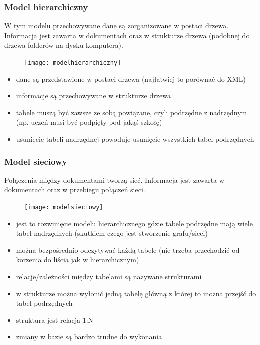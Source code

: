 \documentclass[a4paper,12pt,oneside]{book}
\begin{document}
			\subsubsection{Model hierarchiczny}
			W tym modelu przechowywane dane są zorganizowane w postaci drzewa. Informacja jest zawarta w dokumentach oraz w strukturze drzewa (podobnej do drzewa folderów na dysku komputera).
			\begin{figure}[h]
				\texttt{[image: modelhierarchiczny]}
				\centering
			\end{figure}
			\begin{itemize}
				\itemsep 0em
				\item dane są przedstawione w postaci drzewa (najłatwiej to porównać do XML)
				\item informacje są przechowywane w strukturze drzewa
				\item tabele muszą być zawsze ze sobą powiązane, czyli podrzędne z nadrzędnym (np.
				uczeń musi być podpięty pod jakąś szkołę)
				\item usunięcie tabeli nadrzędnej powoduje usunięcie wszystkich tabel podrzędnych
			\end{itemize}
			\subsubsection{Model sieciowy}
			Połączenia między dokumentami tworzą sieć. Informacja jest zawarta w dokumentach oraz w przebiegu połączeń sieci.
			\begin{figure}[h]
				\texttt{[image: modelsieciowy]}
				\centering
			\end{figure}
			\begin{itemize}
				\itemsep 0em
				\item jest to rozwinięcie modelu hierarchicznego gdzie tabele podrzędne mają wiele tabel
				nadrzędnych (skutkiem czego jest stworzenie grafu/sieci)
				\item można bezpośrednio odczytywać każdą tabele (nie trzeba przechodzić od korzenia
				do liścia jak w hierarchicznym)
				\item relacje/zależności między tabelami są nazywane strukturami
				\item w strukturze można wyłonić jedną tabelę główną z której to można przejść do tabel
				podrzędnych
				\item struktura jest relacja 1:N
				\item zmiany w bazie są bardzo trudne do wykonania
			\end{itemize}
\end{document}
